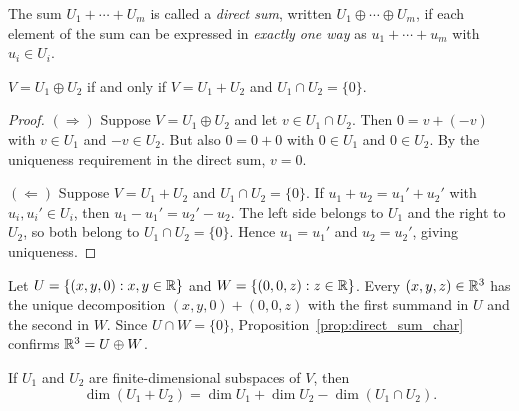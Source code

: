 \documentclass[11pt,a4paper]{article}
\begin{document}
\begin{definition}
\label{def:direct_sum}
The sum $U_1 + \cdots + U_m$ is called a \emph{direct sum}, written
$U_1 \oplus \cdots \oplus U_m$, if each element of the sum can be expressed
in \emph{exactly one way} as $u_1 + \cdots + u_m$ with $u_i \in U_i$.
\end{definition}

\begin{proposition}
\label{prop:direct_sum_char}
$V = U_1 \oplus U_2$ if and only if $V = U_1 + U_2$ and $U_1 \cap U_2 = \{0\}$.
\end{proposition}

\begin{proof}
$(\Rightarrow)$\; Suppose $V = U_1 \oplus U_2$ and let $v \in U_1 \cap U_2$.
Then $0 = v + (-v)$ with $v \in U_1$ and $-v \in U_2$.  But also $0 = 0 + 0$
with $0 \in U_1$ and $0 \in U_2$.  By the uniqueness requirement in the direct
sum, $v = 0$.

$(\Leftarrow)$\; Suppose $V = U_1 + U_2$ and $U_1 \cap U_2 = \{0\}$.  If
$u_1 + u_2 = u_1' + u_2'$ with $u_i, u_i' \in U_i$, then
$u_1 - u_1' = u_2' - u_2$.  The left side belongs to $U_1$ and the right to
$U_2$, so both belong to $U_1 \cap U_2 = \{0\}$.  Hence $u_1 = u_1'$ and
$u_2 = u_2'$, giving uniqueness.
\end{proof}

\begin{example}
\label{ex:direct_sum_R3}
Let $U = \{(x, y, 0) : x, y \in \mathbb{R}\}$ and $W = \{(0, 0, z) : z \in \mathbb{R}\}$.
Every $(x,y,z) \in \mathbb{R}^3$ has the unique decomposition $(x,y,0) + (0,0,z)$
with the first summand in $U$ and the second in $W$.  Since $U \cap W = \{0\}$,
Proposition~\ref{prop:direct_sum_char} confirms $\mathbb{R}^3 = U \oplus W$.
\end{example}

\begin{theorem}
\label{thm:dim_sum}
If $U_1$ and $U_2$ are finite-dimensional subspaces of $V$, then
\[
  \dim(U_1 + U_2) = \dim U_1 + \dim U_2 - \dim(U_1 \cap U_2).
\]
\end{theorem}
\end{document}
